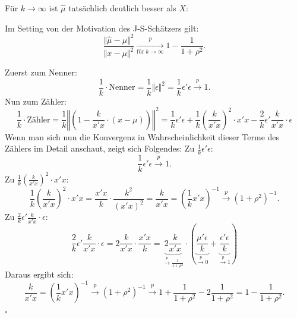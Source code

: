 \documentclass[10pt]{article}
\newcommand{\KW}{\overset{p} \longrightarrow} %
\newenvironment{BWS}[1][]
{\begin{Beweis}[frametitle=#1]}{\end{Beweis}}
\begin{document}
	Für $k \rightarrow \infty$ ist $\hat{\mu}$ tatsächlich deutlich besser als $X$:
	
	\begin{Proposition}[Proposition 1.5.2]
		Im Setting von der Motivation des J-S-Schätzers gilt:
		\begin{equation*}
			\frac{\Vert \hat{\mu} - \mu \Vert^2}{\Vert x - \mu \Vert^2} \underset{\text{für} \; k \rightarrow \infty} {\KW} 1 - \frac{1}{1+ \rho^2}.
		\end{equation*}
	\end{Proposition}
	

	
	\begin{BWS}[Beweis 1.5.1]
		Zuerst zum Nenner:
		\begin{equation*}
			\frac{1}{k} \cdot \text{Nenner} = \frac{1}{k} \Vert \epsilon \Vert^2 = \frac{1}{k} \epsilon'\epsilon \KW 1.
		\end{equation*}
		Nun zum Zähler:
		\begin{equation*}
			\frac{1}{k} \cdot \text{Zähler} = \frac{1}{k} \left\Vert \left( 1 - \frac{k}{x'x} \cdot (x-\mu) \right) \right\Vert^2 = \frac{1}{k} \epsilon' \epsilon + \frac{1}{k} \left(\frac{k}{x'x}\right)^2 \cdot x'x - \frac{2}{k} \epsilon' \frac{k}{x'x} \cdot \epsilon
		\end{equation*}
		Wenn man sich nun die Konvergenz in Wahrscheinlichkeit dieser Terme des Zählers im Detail anschaut, zeigt sich Folgendes:
		Zu $\frac{1}{k} \epsilon' \epsilon$:
		\begin{equation*}
			\frac{1}{k} \epsilon' \epsilon \KW 1.
		\end{equation*}
		Zu $\frac{1}{k} \left(\frac{k}{x'x}\right)^2 \cdot x'x$:
		\begin{equation*}
			\frac{1}{k} \left(\frac{k}{x'x}\right)^2 \cdot x'x = \frac{x'x}{k} \cdot \frac{k^2}{(x'x)^2} = \frac{k}{x'x} = \left(\frac{1}{k} x'x\right)^{-1} \KW (1+\rho^2)^{-1}.
		\end{equation*}
		Zu $\frac{2}{k} \epsilon' \frac{k}{x'x} \cdot \epsilon$:
		\begin{equation*}
			\frac{2}{k} \epsilon' \frac{k}{x'x} \cdot \epsilon = 2 \frac{k}{x'x} \cdot \frac{x'x}{k} = \underbrace{2 \frac{k}{x'x}}_{\KW \frac{1}{1+\rho^2}} \cdot (\underbrace{\frac{\mu' \epsilon}{k}}_{\KW 0} + \underbrace{\frac{\epsilon'\epsilon}{k}}_{\KW 1})
		\end{equation*}
		Daraus ergibt sich:
		\begin{equation*}
			\frac{k}{x'x} = \left(\frac{1}{k} x'x\right)^{-1} \KW (1+\rho^2)^{-1} \KW 1 + \frac{1}{1+ \rho^2} - 2\frac{1}{1+\rho^2} = 1- \frac{1}{1+\rho^2}.
		\end{equation*}
		\begin{flushright}
			$\square$
		\end{flushright}
	\end{BWS}
	
\end{document}
